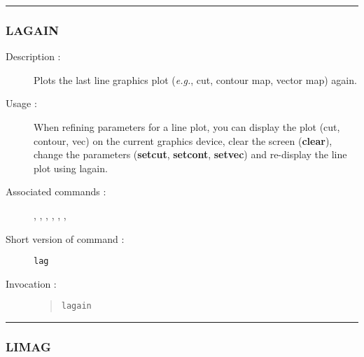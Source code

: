 \hrule
\subsubsection*{\label{LAGAIN}LAGAIN}

\begin{description}

\item[Description :] Plots the last line graphics plot (\emph{e.g.},
cut, contour map, vector map) again.

\item[Usage :] When refining parameters for a line plot, you can
display the plot (cut, contour, vec) on the current graphics device,
clear the screen ({\bf clear}), change the parameters ({\bf setcut},
{\bf setcont}, {\bf setvec}) and re-display the line plot using
lagain.

\item[Associated commands :] {\tt {}},
{\tt {}}, {\tt {}},
{\tt {}}, {\tt {}},
{\tt {}}, {\tt {}}
\item[Short version of command :] {\tt lag}
\item[Invocation :]

\begin{quote}{\tt  lagain }\end{quote}

\end{description}

\hrule
\subsubsection*{\label{LIMAG}LIMAG}

